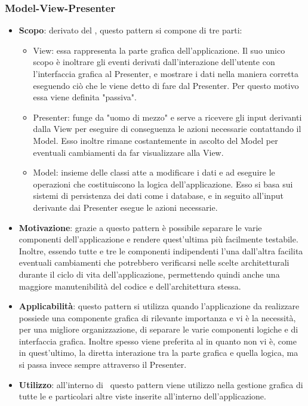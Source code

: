 \subsubsection{Model-View-Presenter}
\begin{itemize}
	\item \textbf{Scopo}: derivato del , questo pattern si compone di tre parti:
		  \begin{itemize}
		    	\item View: essa rappresenta la parte grafica dell'applicazione. Il suo unico scopo è inoltrare gli eventi derivati dall'interazione dell'utente con l'interfaccia grafica al Presenter, e mostrare i dati nella maniera corretta eseguendo ciò che le viene detto di fare dal Presenter. Per questo motivo essa viene definita "passiva".
		    	\item Presenter: funge da "uomo di mezzo" e serve a ricevere gli input derivanti dalla View per eseguire di conseguenza le azioni necessarie contattando il Model. Esso inoltre rimane costantemente in ascolto del Model per eventuali cambiamenti da far visualizzare alla View.
		    	\item Model: insieme delle classi atte a modificare i dati e ad eseguire le operazioni che costituiscono la logica dell'applicazione. Esso si basa sui sistemi di persistenza dei dati come i database, e in seguito all'input derivante dai Presenter esegue le azioni necessarie.
		  \end{itemize}		   
	\item \textbf{Motivazione}: grazie a questo pattern è possibile separare le varie componenti dell'applicazione e rendere quest'ultima più facilmente testabile. Inoltre, essendo tutte e tre le componenti indipendenti l'una dall'altra facilita eventuali cambiamenti che potrebbero verificarsi nelle scelte architetturali durante il ciclo di vita dell'applicazione, permettendo quindi anche una maggiore manutenibilità del codice e dell'architettura stessa.
	\item \textbf{Applicabilità}: questo pattern si utilizza quando l'applicazione da realizzare possiede una componente grafica di rilevante importanza e vi è la necessità, per una migliore organizzazione, di separare le varie componenti logiche e di interfaccia grafica. Inoltre spesso viene preferita al  in quanto non vi è, come in quest'ultimo, la diretta interazione tra la parte grafica e quella logica, ma si passa invece sempre attraverso il Presenter.
	\item \textbf{Utilizzo}: all'interno di \progettoShort\ questo pattern viene utilizzo nella gestione grafica di tutte le  e particolari altre viste inserite all'interno dell'applicazione.
\end{itemize}

